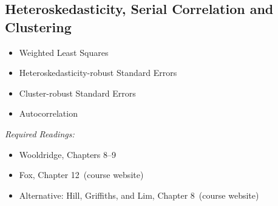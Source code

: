 \documentclass[PS]{syllabus}
\newif\ifrelease
\newcommand{\onsite}{\ifrelease\else\ (course website)\fi}
\begin{document}
\begin{syllabus}
\subsection{Heteroskedasticity, Serial Correlation and Clustering}
	\begin{itemize}
	\item Weighted Least Squares
	\item Heteroskedasticity-robust Standard Errors
	\item Cluster-robust Standard Errors
	\item Autocorrelation
\end{itemize}
\textit{Required Readings:} \begin{itemize}
  \item Wooldridge, Chapters 8--9
\item  Fox, Chapter 12\onsite
  \item Alternative: Hill, Griffiths, and Lim, Chapter 8\onsite
\end{itemize}



\end{syllabus}
\end{document}

